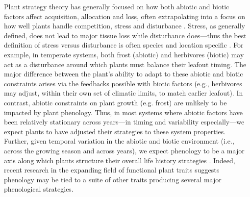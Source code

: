 \documentclass[11pt,a4paper,oneside]{article}
\begin{document}
Plant strategy theory has generally focused on how both abiotic and biotic factors affect acquisition, allocation and loss, often extrapolating into a focus on how well plants handle competition, stress and disturbance \citep{Grime:1977sw}. Stress, as generally defined, does not lead to major tissue loss while disturbance does---thus the best definition of stress versus disturbance is often species and location specific \citep{crainebook}. For example, in temperate systems, both frost (abiotic) and herbivores (biotic) may act as a disturbance around which plants must balance their leafout timing. The major difference between the plant's ability to adapt to these abiotic and biotic constraints arises via the feedbacks possible with biotic factors (e.g., herbivores may adjust, within their own set of climatic limits, to match earlier leafout). In contrast, abiotic constraints on plant growth (e.g. frost) are unlikely to be impacted by plant phenology.  Thus, in most systems where abiotic factors have been relatively stationary across years---in timing and variability especially---we expect plants to have adjusted their strategies to these system properties. Further, given temporal variation in the abiotic and biotic environment (i.e., across the growing season and across years), we expect phenology to be a major axis along which plants structure their overall life history strategies \citep{Grime:1977sw}. Indeed, recent research in the expanding field of functional plant traits suggests phenology may be tied to a suite of other traits producing several major phenological strategies.\\
\end{document}
